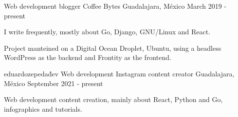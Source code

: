 \begin{cventries}
  \cventry
    {Web development blogger}
    {Coffee Bytes}
    {Guadalajara, México}
    {March 2019 - present}
    {
      \begin{cvitems}
        \item {I write frequently, mostly about Go, Django, GNU/Linux and React.}
        \item {Project manteined on a Digital Ocean Droplet, Ubuntu, using a headless WordPress as the backend and Frontity as the frontend.}
      \end{cvitems}
    }
  \cventry
    {eduardozepeda\.dev}
    {Web development Instagram content creator}
    {Guadalajara, México}
    {September 2021 - present}
    {
      \begin{cvitems}
        \item {Web development content creation, mainly about React, Python and Go, infographics and tutorials. }
      \end{cvitems}
    }

\end{cventries}

